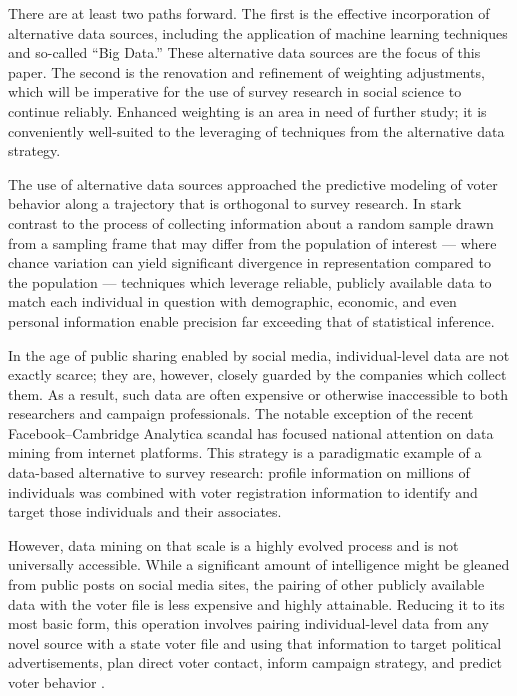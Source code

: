 \documentclass[12pt]{article}
\begin{document}
There are at least two paths forward. The first is the effective incorporation of alternative data sources, including the application of machine learning techniques and so-called ``Big Data.'' These alternative data sources are the focus of this paper. The second is the renovation and refinement of weighting adjustments, which will be imperative for the use of survey research in social science to continue reliably. Enhanced weighting is an area in need of further study; it is conveniently well-suited to the leveraging of techniques from the alternative data strategy.

The use of alternative data sources approached the predictive modeling of voter behavior along a trajectory that is orthogonal to survey research. In stark contrast to the process of collecting information about a random sample drawn from a sampling frame that may differ from the population of interest --- where chance variation can yield significant divergence in representation compared to the population --- techniques which leverage reliable, publicly available data to match each individual in question with demographic, economic, and even personal information enable precision far exceeding that of statistical inference.

In the age of public sharing enabled by social media, individual-level data are not exactly scarce; they are, however, closely guarded by the companies which collect them. As a result, such data are often expensive or otherwise inaccessible to both researchers and campaign professionals. The notable exception of the recent Facebook--Cambridge Analytica scandal has focused national attention on data mining from internet platforms. This strategy is a paradigmatic example of a data-based alternative to survey research: profile information on millions of individuals was combined with voter registration information to identify and target those individuals and their associates.
 
However, data mining on that scale is a highly evolved process and is not universally accessible. While a significant amount of intelligence might be gleaned from public posts on social media sites, the pairing of other publicly available data with the voter file is less expensive and highly attainable. Reducing it to its most basic form, this operation involves pairing individual-level data from any novel source with a state voter file and using that information to target political advertisements, plan direct voter contact, inform campaign strategy, and predict voter behavior \cite{Igielnik:2018aa}.
\end{document}
